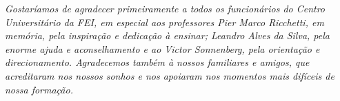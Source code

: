 \documentclass[../../layout.tex]{subfiles}
\begin{document}
\begin{dedicatoria}
\vspace*{\fill}

\noindent
\begin{flushright} 
\begin{minipage}{0.5\textwidth}
\textit{Gostaríamos de agradecer primeiramente a todos os funcionários do Centro Universitário da FEI, em especial aos professores Pier Marco Ricchetti, em memória, pela inspiração e dedicação à ensinar; Leandro Alves da Silva, pela enorme ajuda e aconselhamento e ao  Victor Sonnenberg, pela orientação e direcionamento. Agradecemos também à nossos familiares e amigos, que acreditaram nos nossos sonhos e nos apoiaram nos momentos mais difíceis de nossa formação.}
\end{minipage}
\end{flushright}

\end{dedicatoria}
\end{document}
